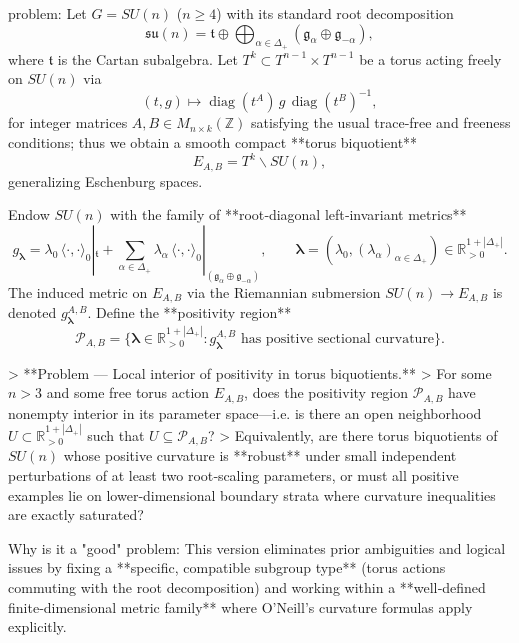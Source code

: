 problem:  
Let \(G=SU(n)\) (\(n\ge4\)) with its standard root decomposition  
\[
\mathfrak{su}(n)=\mathfrak{t}\oplus\bigoplus_{\alpha\in\Delta_+}(\mathfrak{g}_\alpha\oplus\mathfrak{g}_{-\alpha}),
\]
where \(\mathfrak{t}\) is the Cartan subalgebra.  
Let \(T^k\subset T^{n-1}\times T^{n-1}\) be a torus acting freely on \(SU(n)\) via  
\[
(t,g)\mapsto \operatorname{diag}(t^{A})\, g\, \operatorname{diag}(t^{B})^{-1},
\]
for integer matrices \(A,B\in M_{n\times k}(\mathbb{Z})\) satisfying the usual trace‑free and freeness conditions; thus we obtain a smooth compact **torus biquotient**
\[
E_{A,B}=T^k\backslash SU(n),
\]
generalizing Eschenburg spaces.  

Endow \(SU(n)\) with the family of **root‑diagonal left‑invariant metrics**
\[
g_{\boldsymbol{\lambda}}=\lambda_0\,\langle\cdot,\cdot\rangle_0|_{\mathfrak{t}}
+ \sum_{\alpha\in\Delta_+}\lambda_\alpha\, \langle\cdot,\cdot\rangle_0|_{(\mathfrak{g}_\alpha\oplus\mathfrak{g}_{-\alpha})},
\qquad 
\boldsymbol{\lambda}=(\lambda_0,(\lambda_\alpha)_{\alpha\in\Delta_+})\in\mathbb{R}_{>0}^{1+|\Delta_+|}.
\]
The induced metric on \(E_{A,B}\) via the Riemannian submersion \(SU(n)\to E_{A,B}\) is denoted \(g^{A,B}_{\boldsymbol{\lambda}}\).  
Define the **positivity region**  
\[
\mathcal{P}_{A,B}=\{\boldsymbol{\lambda}\in\mathbb{R}_{>0}^{1+|\Delta_+|}: g^{A,B}_{\boldsymbol{\lambda}}\text{ has positive sectional curvature}\}.
\]

> **Problem — Local interior of positivity in torus biquotients.**  
> For some \(n>3\) and some free torus action \(E_{A,B}\), does the positivity region \(\mathcal{P}_{A,B}\) have nonempty interior in its parameter space—i.e. is there an open neighborhood \(U\subset\mathbb{R}_{>0}^{1+|\Delta_+|}\) such that \(U\subseteq \mathcal{P}_{A,B}\)?  
> Equivalently, are there torus biquotients of \(SU(n)\) whose positive curvature is **robust** under small independent perturbations of at least two root‑scaling parameters, or must all positive examples lie on lower‑dimensional boundary strata where curvature inequalities are exactly saturated?

Why is it a "good" problem:  
This version eliminates prior ambiguities and logical issues by fixing a **specific, compatible subgroup type** (torus actions commuting with the root decomposition) and working within a **well‑defined finite‑dimensional metric family** where O’Neill’s curvature formulas apply explicitly.

